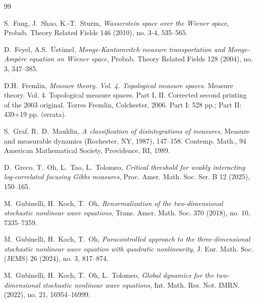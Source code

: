 \documentclass[letterpaper, 11pt,  reqno]{amsart}
\newcommand{\1}{\hspace{0.5mm}\text{I}\hspace{0.2mm}}
\numberwithin{equation}{section}
\numberwithin{theorem}{section}
\begin{document}
\begin{thebibliography}{99}
%
%
%

S.~Fang, J.~Shao, K.-T.~Sturm, 
{\it Wasserstein space over the Wiener space}, 
Probab. Theory Related Fields 146 (2010), no. 3-4, 535--565.


D.~Feyel, A.S.~\"Ust\"unel, 
{\it Monge-Kantorovitch measure transportation and Monge-Amp\`ere equation on Wiener space},
Probab. Theory Related Fields 128 (2004), no. 3, 347--385. 



D.H.~Fremlin, 
{\it Measure theory. Vol. 4. Topological measure spaces.}
Measure theory. Vol. 4. Topological measure spaces. Part I, II. Corrected second printing of the 2003 original. Torres Fremlin, Colchester, 2006. Part I: 528 pp.; Part II: 439+19 pp. (errata).





S.~Graf, R.~D.~Mauldin,
{\it A classification of disintegrations of measures}, 
Measure and measurable dynamics (Rochester, NY, 1987), 147--158.
Contemp. Math., 94
American Mathematical Society, Providence, RI, 1989.

D.~Greco, T.~Oh, L.~Tao, L.~Tolomeo,
{\it  Critical threshold for weakly interacting log-correlated focusing Gibbs measures}, Proc. Amer. Math. Soc. Ser. B 12 (2025), 150--165. 

M.~Gubinelli, H.~Koch, T.~Oh,
{\it Renormalization of the two-dimensional stochastic nonlinear wave equations}, 
Trans. Amer. Math. Soc. 370 (2018), no. 10, 7335--7359.


M.~Gubinelli, H.~Koch, T.~Oh,
{\it Paracontrolled approach to the three-dimensional stochastic nonlinear wave equation with quadratic nonlinearity}, 
J. Eur. Math. Soc. (JEMS) 26 (2024), no. 3, 817--874.


M.~Gubinelli, H.~Koch, T.~Oh, L.~Tolomeo,
{\it Global dynamics for the two-dimensional stochastic nonlinear wave equations}, 
Int. Math. Res. Not. IMRN. (2022), no. 21, 16954--16999. 


%




\end{thebibliography}
\end{document}
